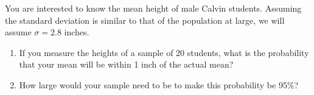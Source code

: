 \documentclass[twoside]{book}\usepackage[]{graphicx}\usepackage[]{xcolor}
\begin{document}
\begin{problem}
	You are interested to know the mean height of male Calvin students.
	Assuming the standard deviation is similar to that of the population
	at large, we will assume $\sigma = 2.8$ inches.

	\begin{enumerate}

		\item If you measure the heights of a sample of 20 students,
			what is the probability that your mean will be within 
			1 inch of the actual mean?
			
		\item
			How large would your sample need to be to make this probability
			be 95\%?
	\end{enumerate}
\end{problem}
\end{document}
